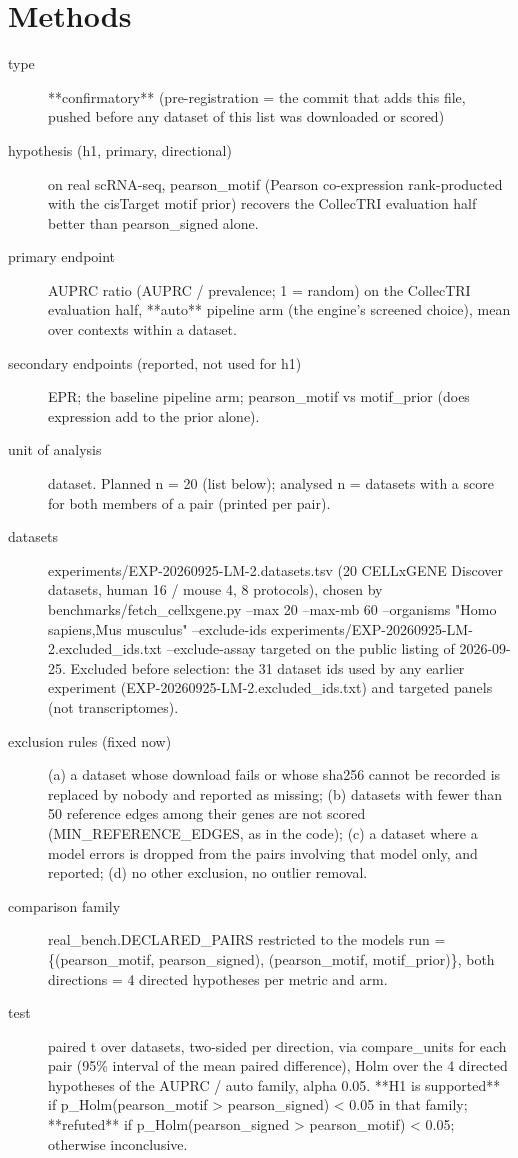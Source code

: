 \documentclass{article}
\begin{document}
\section{Methods}
\begin{description}
\item[type] **confirmatory** (pre-registration = the commit that adds this file, pushed before any dataset of this list was downloaded or scored)
\item[hypothesis (h1, primary, directional)] on real scRNA-seq, pearson\_motif (Pearson co-expression rank-producted with the cisTarget motif prior) recovers the CollecTRI evaluation half better than pearson\_signed alone.
\item[primary endpoint] AUPRC ratio (AUPRC / prevalence; 1 = random) on the CollecTRI evaluation half, **auto** pipeline arm (the engine's screened choice), mean over contexts within a dataset.
\item[secondary endpoints (reported, not used for h1)] EPR; the baseline pipeline arm; pearson\_motif vs motif\_prior (does expression add to the prior alone).
\item[unit of analysis] dataset. Planned n = 20 (list below); analysed n = datasets with a score for both members of a pair (printed per pair).
\item[datasets] experiments/EXP-20260925-LM-2.datasets.tsv (20 CELLxGENE Discover datasets, human 16 / mouse 4, 8 protocols), chosen by benchmarks/fetch\_cellxgene.py --max 20 --max-mb 60 --organisms "Homo sapiens,Mus musculus" --exclude-ids experiments/EXP-20260925-LM-2.excluded\_ids.txt --exclude-assay targeted on the public listing of 2026-09-25. Excluded before selection: the 31 dataset ids used by any earlier experiment (EXP-20260925-LM-2.excluded\_ids.txt) and targeted panels (not transcriptomes).
\item[exclusion rules (fixed now)] (a) a dataset whose download fails or whose sha256 cannot be recorded is replaced by nobody and reported as missing; (b) datasets with fewer than 50 reference edges among their genes are not scored (MIN\_REFERENCE\_EDGES, as in the code); (c) a dataset where a model errors is dropped from the pairs involving that model only, and reported; (d) no other exclusion, no outlier removal.
\item[comparison family] real\_bench.DECLARED\_PAIRS restricted to the models run = \{(pearson\_motif, pearson\_signed), (pearson\_motif, motif\_prior)\}, both directions = 4 directed hypotheses per metric and arm.
\item[test] paired t over datasets, two-sided per direction, via compare\_units for each pair (95\% interval of the mean paired difference), Holm over the 4 directed hypotheses of the AUPRC / auto family, alpha 0.05. **H1 is supported** if p\_Holm(pearson\_motif > pearson\_signed) < 0.05 in that family; **refuted** if p\_Holm(pearson\_signed > pearson\_motif) < 0.05; otherwise inconclusive.

\end{description}
\end{document}
